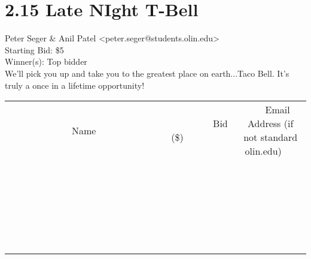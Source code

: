 \documentclass[11pt]{article}
\begin{document}
					\section*{2.15 Late NIght T-Bell}
					Peter Seger \& Anil Patel <peter.seger@students.olin.edu> \\
					Starting Bid: \$5 \\
					Winner(s): Top bidder \\
					We'll pick you up and take you to the greatest place on earth...Taco Bell. It's truly a once in a lifetime opportunity! \\
					[6ex]
					\begin{tabular}{c c c}
						~~~~~~~~~~~~~Name~~~~~~~~~~~~~ & ~~~~~~~~~Bid (\$)~~~~~~~~~ & ~~~Email Address (if not standard olin.edu)~~~ \\
				
 & & \\
\hline
 & & \\
\hline
 & & \\
\hline
 & & \\
\hline
 & & \\
\hline
 & & \\
\hline
 & & \\
\hline
 & & \\
\hline
 & & \\
\hline
 & & \\
\hline
 & & \\
\hline
 & & \\
\hline
 & & \\
\hline
 & & \\
\hline
 & & \\
\hline
 & & \\
\hline
 & & \\
\hline
 & & \\
\hline
 & & \\
\hline
 & & \\
\hline
 & & \\
\hline
 & & \\
\hline
 & & \\
\hline
 & & \\
\hline
 & & \\
\hline
 & & \\
\hline
					\end{tabular}
					\clearpage
				
\end{document}
